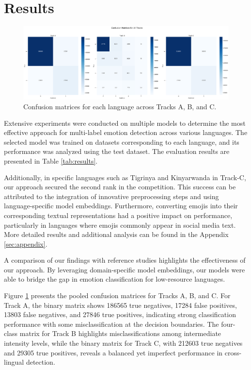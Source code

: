 \section{Results}
\begin{figure}[t]
    \centering
    \includegraphics[width=1.7\columnwidth]{images/confusion_matrices_all_tracks.png}
    \caption{Confusion matrices for each language across Tracks A, B, and C.}
    \label{fig:confusion_matrices}
\end{figure}
Extensive experiments were conducted on multiple models to determine the most effective approach for multi-label emotion detection across various languages. The selected model was trained on datasets corresponding to each language, and its performance was analyzed using the test dataset. The evaluation results are presented in Table \ref{tab:results}.

Additionally, in specific languages such as Tigrinya and Kinyarwanda in Track-C, our approach secured the second rank in the competition. This success can be attributed to the integration of innovative preprocessing steps and using language-specific model embeddings. Furthermore, converting emojis into their corresponding textual representations had a positive impact on performance, particularly in languages where emojis commonly appear in social media text. More detailed results and additional analysis can be found in the Appendix \ref{sec:appendix}.

A comparison of our findings with reference studies \cite{muhammad2025brighterbridginggaphumanannotated} highlights the effectiveness of our approach. By leveraging domain-specific model embeddings, our models were able to bridge the gap in emotion classification for low-resource languages.

Figure \ref{fig:confusion_matrices} presents the pooled confusion matrices for Tracks A, B, and C. For Track A, the binary matrix shows 186565 true negatives, 17284 false positives, 13803 false negatives, and 27846 true positives, indicating strong classification performance with some misclassification at the decision boundaries. The four-class matrix for Track B highlights misclassifications among intermediate intensity levels, while the binary matrix for Track C, with 212603 true negatives and 29305 true positives, reveals a balanced yet imperfect performance in cross-lingual detection.

